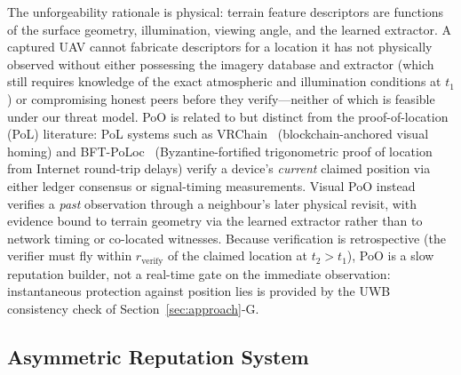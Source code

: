 \documentclass[journal,10pt,twocolumn]{IEEEtran}
\begin{document}
The unforgeability rationale is physical: terrain feature descriptors are functions of the surface geometry, illumination, viewing angle, and the learned extractor. A captured UAV cannot fabricate descriptors for a location it has not physically observed without either possessing the imagery database and extractor (which still requires knowledge of the exact atmospheric and illumination conditions at $t_1$) or compromising honest peers before they verify---neither of which is feasible under our threat model. PoO is related to but distinct from the proof-of-location (PoL) literature: PoL systems such as VRChain~\cite{rahouti2022vrchain} (blockchain-anchored visual homing) and BFT-PoLoc~\cite{sheng2024bftpoloc} (Byzantine-fortified trigonometric proof of location from Internet round-trip delays) verify a device's \emph{current} claimed position via either ledger consensus or signal-timing measurements. Visual PoO instead verifies a \emph{past} observation through a neighbour's later physical revisit, with evidence bound to terrain geometry via the learned extractor rather than to network timing or co-located witnesses. Because verification is retrospective (the verifier must fly within $r_\text{verify}$ of the claimed location at $t_2>t_1$), PoO is a slow reputation builder, not a real-time gate on the immediate observation: instantaneous protection against position lies is provided by the UWB consistency check of Section~\ref{sec:approach}-G.

\subsection{Asymmetric Reputation System}
\label{sec:asymmetric-reputation-system}
\end{document}
